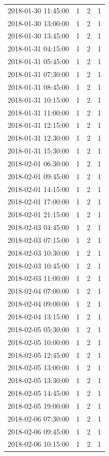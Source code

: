 \begin{tabular}{lrrr}
2018-01-30 11:45:00 & 1 & 2 & 1 \\
2018-01-30 13:00:00 & 1 & 2 & 1 \\
2018-01-30 13:45:00 & 1 & 2 & 1 \\
2018-01-31 04:15:00 & 1 & 2 & 1 \\
2018-01-31 05:45:00 & 1 & 2 & 1 \\
2018-01-31 07:30:00 & 1 & 2 & 1 \\
2018-01-31 08:45:00 & 1 & 2 & 1 \\
2018-01-31 10:15:00 & 1 & 2 & 1 \\
2018-01-31 11:00:00 & 1 & 2 & 1 \\
2018-01-31 12:15:00 & 1 & 2 & 1 \\
2018-01-31 12:30:00 & 1 & 2 & 1 \\
2018-01-31 15:30:00 & 1 & 2 & 1 \\
2018-02-01 06:30:00 & 1 & 2 & 1 \\
2018-02-01 09:45:00 & 1 & 2 & 1 \\
2018-02-01 14:15:00 & 1 & 2 & 1 \\
2018-02-01 17:00:00 & 1 & 2 & 1 \\
2018-02-01 21:15:00 & 1 & 2 & 1 \\
2018-02-03 04:45:00 & 1 & 2 & 1 \\
2018-02-03 07:15:00 & 1 & 2 & 1 \\
2018-02-03 10:30:00 & 1 & 2 & 1 \\
2018-02-03 10:45:00 & 1 & 2 & 1 \\
2018-02-03 11:00:00 & 1 & 2 & 1 \\
2018-02-04 07:00:00 & 1 & 2 & 1 \\
2018-02-04 09:00:00 & 1 & 2 & 1 \\
2018-02-04 13:15:00 & 1 & 2 & 1 \\
2018-02-05 05:30:00 & 1 & 2 & 1 \\
2018-02-05 10:00:00 & 1 & 2 & 1 \\
2018-02-05 12:45:00 & 1 & 2 & 1 \\
2018-02-05 13:00:00 & 1 & 2 & 1 \\
2018-02-05 13:30:00 & 1 & 2 & 1 \\
2018-02-05 14:45:00 & 1 & 2 & 1 \\
2018-02-05 19:00:00 & 1 & 2 & 1 \\
2018-02-06 07:30:00 & 1 & 2 & 1 \\
2018-02-06 09:45:00 & 1 & 2 & 1 \\
2018-02-06 10:15:00 & 1 & 2 & 1 \\

\end{tabular}
